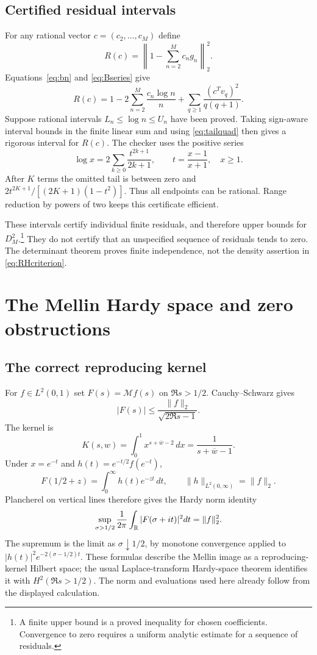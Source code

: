 \documentclass[11pt]{amsart}
\theoremstyle{definition}
\begin{document}
\subsection{Certified residual intervals}
For any rational vector $c=(c_2,\ldots,c_M)$ define
\[
 R(c)=\left\|1-\sum_{n=2}^M c_ng_n\right\|_2^2.
\]
Equations~\eqref{eq:bn} and \eqref{eq:Bseries} give
\begin{equation}\label{eq:residual}
 R(c)=1-2\sum_{n=2}^M\frac{c_n\log n}{n}
             +\sum_{q\ge1}\frac{(c^Tv_q)^2}{q(q+1)}.
\end{equation}
Suppose rational intervals $L_n\le\log n\le U_n$ have been proved.
Taking sign-aware interval bounds in the finite linear sum and using
\eqref{eq:tailquad} then gives a rigorous interval for $R(c)$.
The checker uses the positive series
\begin{equation}\label{eq:logseries}
 \log x=2\sum_{k\ge0}\frac{t^{2k+1}}{2k+1},\qquad
 t=\frac{x-1}{x+1},\quad x\ge1.
\end{equation}
After $K$ terms the omitted tail is between zero and
$2t^{2K+1}/[(2K+1)(1-t^2)]$. Thus all endpoints can be rational.
Range reduction by powers of two keeps this certificate efficient.

These intervals certify individual finite residuals, and therefore
upper bounds for $D_M^2$.\footnote{A finite upper bound is a proved
inequality for chosen coefficients. Convergence to zero requires a
uniform analytic estimate for a sequence of residuals.}
They do not certify that an unspecified
sequence of residuals tends to zero. The determinant theorem proves
finite independence, not the density assertion in
\eqref{eq:RHcriterion}.

\section{The Mellin Hardy space and zero obstructions}
\subsection{The correct reproducing kernel}
For $f\in L^2(0,1)$ set $F(s)=\mathcal Mf(s)$ on $\Re s>1/2$.
Cauchy--Schwarz gives
\begin{equation}\label{eq:evaluation}
 |F(s)|\le\frac{\|f\|_2}{\sqrt{2\Re s-1}}.
\end{equation}
The kernel is
\begin{equation}\label{eq:kernel}
 K(s,w)=\int_0^1x^{s+\overline w-2}\,dx
       =\frac1{s+\overline w-1}.
\end{equation}
Under $x=e^{-t}$ and $h(t)=e^{-t/2}f(e^{-t})$,
\[
 F(1/2+z)=\int_0^\infty h(t)e^{-zt}\,dt,\qquad
 \|h\|_{L^2(0,\infty)}=\|f\|_2.
\]
Plancherel on vertical lines therefore gives the Hardy norm identity
\[
 \sup_{\sigma>1/2}\frac1{2\pi}\int_{\mathbb R}|F(\sigma+it)|^2dt
       =\|f\|_2^2.
\]
The supremum is the limit as $\sigma\downarrow1/2$, by monotone
convergence applied to $|h(t)|^2e^{-2(\sigma-1/2)t}$.
These formulas describe the Mellin image as a reproducing-kernel
Hilbert space; the usual Laplace-transform Hardy-space theorem
identifies it with $H^2(\Re s>1/2)$. The norm and evaluations used here
already follow from the displayed calculation.
\end{document}
